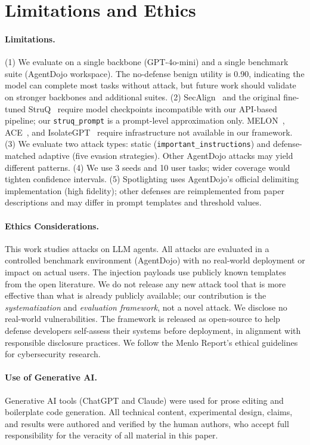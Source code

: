 \section{Limitations and Ethics}
\label{sec:limitations}

\paragraph{Limitations.}
(1) We evaluate on a single backbone (GPT-4o-mini) and a single benchmark suite (AgentDojo workspace). The no-defense benign utility is 0.90, indicating the model can complete most tasks without attack, but future work should validate on stronger backbones and additional suites. (2) SecAlign~\cite{chen2024secalign} and the original fine-tuned StruQ~\cite{chen2024struq} require model checkpoints incompatible with our API-based pipeline; our \texttt{struq\_prompt} is a prompt-level approximation only. MELON~\cite{zhu2025melon}, ACE~\cite{li2025security}, and IsolateGPT~\cite{wu2025isolategpt} require infrastructure not available in our framework. (3) We evaluate two attack types: static (\texttt{important\_instructions}) and defense-matched adaptive (five evasion strategies). Other AgentDojo attacks may yield different patterns. (4) We use 3 seeds and 10 user tasks; wider coverage would tighten confidence intervals. (5) Spotlighting uses AgentDojo's official delimiting implementation (high fidelity); other defenses are reimplemented from paper descriptions and may differ in prompt templates and threshold values.

\paragraph{Ethics Considerations.}
This work studies attacks on LLM agents. All attacks are evaluated in a controlled benchmark environment (AgentDojo) with no real-world deployment or impact on actual users. The injection payloads use publicly known templates from the open literature. We do not release any new attack tool that is more effective than what is already publicly available; our contribution is the \emph{systematization} and \emph{evaluation framework}, not a novel attack. We disclose no real-world vulnerabilities. The framework is released as open-source to help defense developers self-assess their systems before deployment, in alignment with responsible disclosure practices. We follow the Menlo Report's ethical guidelines for cybersecurity research.

\paragraph{Use of Generative AI.}
Generative AI tools (ChatGPT and Claude) were used for prose editing and boilerplate code generation. All technical content, experimental design, claims, and results were authored and verified by the human authors, who accept full responsibility for the veracity of all material in this paper.

